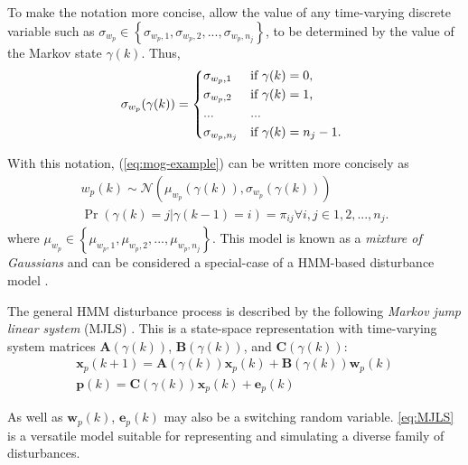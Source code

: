 To make the notation more concise, allow the value of any time-varying discrete variable such as $\sigma_{w_p} \in \left\{\sigma_{w_p,1}, \sigma_{w_p,2},..., \sigma_{w_p,n_j}\right\}$, to be determined by the value of the Markov state $\gamma(k)$. Thus,
\begin{equation} \label{eq:A-selection}
	\sigma_{w_p}(\gamma(k)) = 
	\begin{cases*}
		\sigma_{w_p,1} & if $\gamma(k)=0$, \\
		\sigma_{w_p,2} & if $\gamma(k)=1$, \\
		... & ...\\
		\sigma_{w_p,n_j} & if $\gamma(k)=n_j-1$.
	\end{cases*}
\end{equation}


With this notation, (\ref{eq:mog-example}) can be written more concisely as
\begin{equation} \label{eq:mog-example2}
	\begin{split}
		w_p(k) \sim \mathcal{N}\left(\mu_{w_p}(\gamma(k)), \sigma_{w_p}(\gamma(k))\right) \\
		\Pr(\gamma(k)=j|\gamma(k-1)=i)=\pi_{ij} \forall i,j \in {1,2,...,n_j}.
	\end{split}
\end{equation}
where $\mu_{w_p}\in\left\{\mu_{w_p,1},\mu_{w_p,2},...,\mu_{w_p,n_j}\right\}$. This model is known as a \textit{mixture of Gaussians} and can be considered a special-case of a HMM-based disturbance model \citep{wong_disturbance_2007}.

The general HMM disturbance process is described by the following \textit{Markov jump linear system} (MJLS) \citep{costa_discrete-time_2005}. This is a state-space representation with time-varying system matrices $\mathbf{A}(\gamma(k))$, $\mathbf{B}(\gamma(k))$, and $\mathbf{C}(\gamma(k))$:
\begin{equation} \label{eq:MJLS}
	\begin{split}
	\mathbf{x}_p(k+1) = \mathbf{A}(\gamma(k)) \mathbf{x}_p(k) + \mathbf{B}(\gamma(k))\mathbf{w}_p(k) \\
	\mathbf{p}(k) = \mathbf{C}(\gamma(k)) \mathbf{x}_p(k) + \mathbf{e}_p(k)
	\end{split}
\end{equation}

As well as $\mathbf{w}_p(k)$, $\mathbf{e}_p(k)$ may also be a switching random variable. \ref{eq:MJLS} is a versatile model suitable for representing and simulating a diverse family of disturbances.


